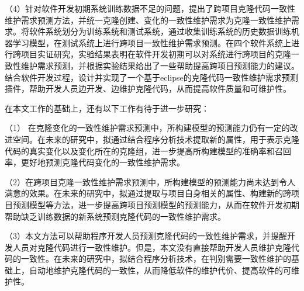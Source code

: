 （4）针对软件开发初期系统训练数据不足的问题，提出了跨项目克隆代码一致性维护需求预测方法，并统一克隆创建、变化的一致性维护需求为克隆一致性维护需求。将软件系统划分为训练系统和测试系统，通过收集训练系统的历史数据训练机器学习模型，在测试系统上进行跨项目一致性维护需求预测。在四个软件系统上进行跨项目实证研究，实验结果表明在软件开发初期可以对系统进行跨项目的克隆一致性维护需求预测，并根据实验结果给出了一些帮助提高跨项目预测能力的建议。结合软件开发过程，设计并实现了一个基于eclipse的克隆代码一致性维护需求预测插件，帮助开发人员边开发、边维护克隆代码，从而提高软件质量和可维护性。

在本文工作的基础上，还有以下工作有待于进一步研究：

（1） 在克隆变化的一致性维护需求预测中，所构建模型的预测能力仍有一定的改进空间。在未来的研究中，拟通过结合程序分析技术提取新的属性，用于表示克隆代码的真实变化以及变化所在的克隆组，进一步提高所构建模型的准确率和召回率，更好地预测克隆代码变化的一致性维护需求。

（2）在跨项目克隆一致性维护需求预测中，所构建模型的预测能力尚未达到令人满意的效果。在未来的研究中，拟通过提取与项目自身相关的属性、构建新的跨项目预测模型等方法，进一步提高跨项目预测模型的预测能力，从而在软件开发初期帮助缺乏训练数据的新系统预测克隆代码的一致性维护需求。

（3）本文方法可以帮助程序开发人员预测克隆代码的一致性维护需求，并提醒开发人员对克隆代码进行一致性维护。但是，本文没有直接帮助开发人员维护克隆代码的一致性。在未来的研究中，拟结合程序分析技术，在判别需要一致性维护的基础上，自动地维护克隆代码的一致性，从而降低软件的维护代价、提高软件的可维护性。